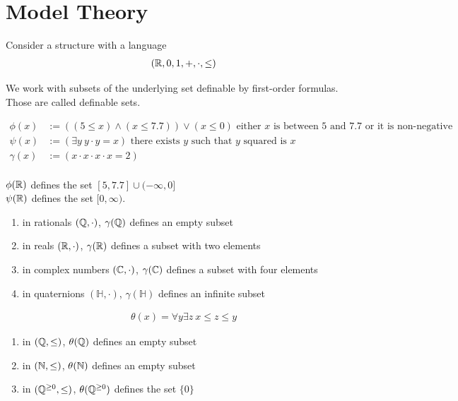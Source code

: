 \documentclass{amsart}
\newcommand{\paren}[1]{\left( #1 \right)}
\begin{document}
\section{Model Theory}

Consider a structure with a language
\begin{align*}
	(\mathbb{R}, 0, 1, +, \cdot, \leq)
\end{align*}

We work with subsets of the underlying set definable by first-order formulas.
Those are called definable sets.

\begin{align*}
	\phi(x) &:= \paren{(5 \leq x) \wedge (x \leq 7.7)} \vee (x \leq 0) \text { either $x$ is between 5 and 7.7 or it is non-negative}\\
	\psi(x) &:= (\exists y \ y \cdot y = x) \text { there exists $y$ such that $y$ squared is $x$ }\\
	\gamma(x) &:= (x \cdot x \cdot x \cdot x = 2) \\
\end{align*}

$\phi(\mathbb{R})$ defines the set $[5, 7.7] \cup (-\infty, 0]$ \\
$\psi(\mathbb{R})$ defines the set $[0, \infty)$.

\begin{enumerate}
	\item in rationals $(\mathbb{Q}, \cdot)$, $\gamma(\mathbb{Q})$ defines an empty subset
	\item in reals $(\mathbb{R}, \cdot)$, $\gamma(\mathbb{R})$ defines a subset with two elements
	\item in complex numbers $(\mathbb{C}, \cdot)$, $\gamma(\mathbb{C})$ defines a subset with four elements
	\item in quaternions $(\mathbb H, \cdot)$, $\gamma(\mathbb H)$ defines an infinite subset
\end{enumerate}

\begin{align*}
	\theta(x) = \forall y \exists z \ x \leq z \leq y
\end{align*}

\begin{enumerate}
	\item in $(\mathbb{Q}, \leq)$, $\theta(\mathbb{Q})$ defines an empty subset
	\item in $(\mathbb{N}, \leq)$, $\theta(\mathbb{N})$ defines an empty subset
	\item in $(\mathbb{Q}^{\geq 0}, \leq)$, $\theta(\mathbb{Q}^{\geq 0})$ defines the set $\{0\}$
\end{enumerate}
\end{document}
